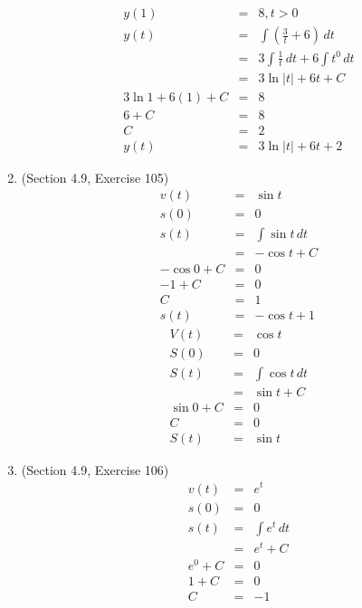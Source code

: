 \documentclass{article}
\begin{document}
\begin{enumerate}
\begin{eqnarray}
            y(1) &=& 8, t > 0 \\
            y(t) &=& \int{\left(\frac{3}{t} + 6\right)}\,dt \\
                 &=& 3\int{\frac{1}{t}}\,dt + 6\int{t^0}\,dt \\
                 &=& 3\ln{|t|} + 6t + C \\
            3\ln{1} + 6(1) + C &=& 8 \\
            6 + C &=& 8 \\
            C &=& 2 \\
            y(t) &=& 3\ln{|t|} + 6t + 2
        \end{eqnarray}
    \item (Section 4.9, Exercise 105)
        \begin{eqnarray}
            v(t) &=& \sin{t} \\
            s(0) &=& 0 \\
            s(t) &=& \int{\sin{t}}\,dt \\
                 &=& -\cos{t} + C \\
            -\cos{0} + C &=& 0 \\
            -1 + C &=& 0 \\
            C &=& 1 \\
            s(t) &=& -\cos{t} + 1
        \end{eqnarray}
        \begin{eqnarray}
            V(t) &=& \cos{t} \\
            S(0) &=& 0 \\
            S(t) &=& \int{\cos{t}}\,dt \\
                 &=& \sin{t} + C \\
            \sin{0} + C &=& 0 \\
            C &=& 0 \\
            S(t) &=& \sin{t}
        \end{eqnarray}
    \item (Section 4.9, Exercise 106)
        \begin{eqnarray}
            v(t) &=& e^t \\
            s(0) &=& 0 \\
            s(t) &=& \int{e^t}\,dt \\
                 &=& e^t + C \\
            e^0 + C &=& 0 \\
            1 + C &=& 0 \\
            C &=& -1 \\

\end{eqnarray}
\end{enumerate}
\end{document}
